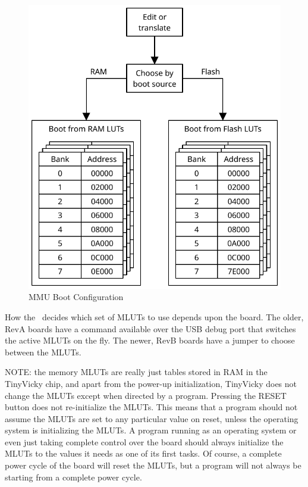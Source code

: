 \begin{figure}[ht]
    \begin{center}
        \includegraphics{images/MemoryLUTSelection.pdf}
    \end{center}
    \caption{MMU Boot Configuration}
    \label{fig:lut_choice}
\end{figure}

How the \jr\ decides which set of MLUTs to use depends upon the board. The older, RevA boards have a command available over the USB debug port that switches the active MLUTs on the fly. The newer, RevB boards have a jumper to choose between the MLUTs.

\begin{leftbar}
	NOTE: the memory MLUTs are really just tables stored in RAM in the TinyVicky chip, and apart from the power-up initialization, TinyVicky does not change the MLUTs except when directed by a program. Pressing the RESET button does not re-initialize the MLUTs. This means that a program should not assume the MLUTs are set to any particular value on reset, unless the operating system is initializing the MLUTs. A program running as an operating system or even just taking complete control over the board should always initialize the MLUTs to the values it needs as one of its first tasks. Of course, a complete power cycle of the board will reset the MLUTs, but a program will not always be starting from a complete power cycle.
\end{leftbar}